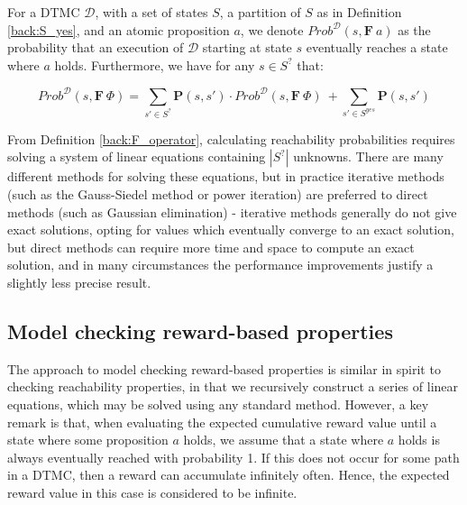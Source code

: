 \begin{definition}
\label{back:F_operator}

    For a DTMC $\mathcal{D}$, with a set of states $S$, a partition of $S$ as in Definition \ref{back:S_yes}, and an atomic proposition $a$, we denote $Prob^{\mathcal{D}}(s, \mathbf{F} \: a)$ as the probability that an execution of $\mathcal{D}$ starting at state $s$ eventually reaches a state where $a$ holds. Furthermore, we have for any $s \in S^{?}$ that:

    \begin{equation*}
        Prob^{\mathcal{D}}(s, \mathbf{F} \: \Phi) = \sum_{s' \in S^{?}} \mathbf{P}(s, s') \cdot Prob^{\mathcal{D}}(s, \mathbf{F} \: \Phi) \: + \sum_{s' \in S^{yes}} \mathbf{P}(s, s')
    \end{equation*}
    
\end{definition}

From Definition \ref{back:F_operator}, calculating reachability probabilities requires solving a system of linear equations containing $|S^{?}|$ unknowns. There are many different methods for solving these equations, but in practice iterative methods (such as the Gauss-Siedel method or power iteration) are preferred to direct methods (such as Gaussian elimination) - iterative methods generally do not give exact solutions, opting for values which eventually converge to an exact solution, but direct methods can require more time and space to compute an exact solution, and in many circumstances the performance improvements justify a slightly less precise result.

\subsection{Model checking reward-based properties}
\label{back:check_rewards}

The approach to model checking reward-based properties is similar in spirit to checking reachability properties, in that we recursively construct a series of linear equations, which may be solved using any standard method. However, a key remark is that, when evaluating the expected cumulative reward value until a state where some proposition $a$ holds, we assume that a state where $a$ holds is always eventually reached with probability 1. If this does not occur for some path in a DTMC, then a reward can accumulate infinitely often. Hence, the expected reward value in this case is considered to be infinite.

